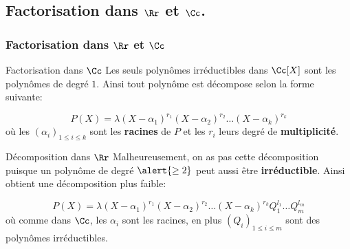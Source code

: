 \documentclass{beamer}
\begin{document}
\subsection{Factorisation dans $\Rr$ et $\Cc$.}
\begin{frame}[t]
  \frametitle{Factorisation dans $\Rr$ et $\Cc$}
 \begin{block}{Factorisation dans $\Cc$}
   \small
   Les seuls polynômes irréductibles dans \alert{$\Cc[X]$} sont les polynômes
   de degré $1$. Ainsi tout polynôme est décompose selon la forme suivante:

   \begin{equation}
     P(X) = \lambda\left(X- \alpha_1\right)^{r_1}\left(X-\alpha_2\right)^{r_2}\ldots \left(X- \alpha_k\right)^{r_k}
   \end{equation}
 où les $\left(\alpha_i\right)_{1\leq i \leq k}$ sont les
 \textbf{\alert{racines}}  de $P$ et les $r_i$ leurs degré de
 \textbf{multiplicité}.
 \end{block} 
 \pause

 \begin{block}{Décomposition dans $\Rr$}
   \small
   Malheureusement, on as pas cette décomposition puisque un polynôme de degré
   $\alert{\geq 2}$ peut aussi être \textbf{irréductible}. Ainsi obtient une
   décomposition plus faible:

   \begin{equation}
     \label{eq:factor_R}
     P(X) = \lambda\left(X- \alpha_1\right)^{r_1}\left(X-
     \alpha_2\right)^{r_2}\ldots \left(X- \alpha_k\right)^{r_k} Q_1^{l_1}\ldots
     Q_m^{l_m}
   \end{equation}
   où comme dans $\Cc$, les $\alpha_i$ sont les racines, en plus
   $\left(Q_i\right)_{1\leq i \leq m }$ sont des polynômes irréductibles.
 \end{block}
\end{frame}
\end{document}
